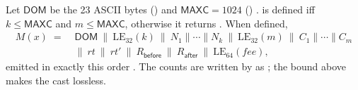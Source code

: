 \begin{definition}
\label{def:app-msg}
Let $\mathsf{DOM}$ be the 23 ASCII bytes 
()  and
$\mathsf{MAXC}=1024$ ()
.  is defined
iff $k\le\mathsf{MAXC}$ and $m\le\mathsf{MAXC}$, otherwise it returns
 . When
defined,
\begin{align}
  M(x) \;=\; {}& \mathsf{DOM}\ \|\ \mathrm{LE}_{32}(k)\ \|\ N_1\|\cdots\|N_k\ \|\ \mathrm{LE}_{32}(m)\ \|\ C_1\|\cdots\|C_m \nonumber\\
         & \|\ rt\ \|\ rt'\ \|\ R_{\mathsf{before}}\ \|\ R_{\mathsf{after}}\ \|\ \mathrm{LE}_{64}(\mathit{fee}),
  \label{eq:app-msg}
\end{align}
emitted in exactly this order . The
counts are written by  as 
; the bound above makes the cast
lossless.
\end{definition}

